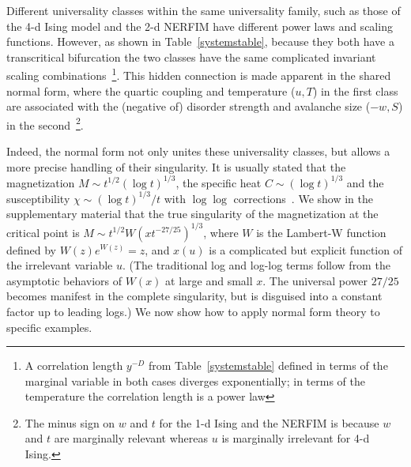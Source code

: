 \documentclass[
 reprint,
 amsmath,amssymb,
 aps, superscriptaddress, pre
]{revtex4-1}
\begin{document}
Different universality classes within the same universality family, such as those of the 4-d Ising model and the 2-d NERFIM have different power laws and scaling functions. However, as shown in Table~\ref{systemstable}, because they both have a transcritical bifurcation the two classes have the same complicated invariant scaling combinations~\footnote{A correlation length $y^{-D}$ from Table~\ref{systemstable} defined in terms of the marginal variable in both cases diverges exponentially; in terms of the temperature the correlation length is a power law}. This hidden connection is made apparent in the shared normal form, where the quartic coupling and temperature ($u,T$) in the first class are associated with the (negative of) disorder strength and avalanche size ($-w,S$) in the second~\footnote{The minus sign on $w$ and $t$ for the 1-d Ising
and the NERFIM is because $w$ and $t$ are 
marginally relevant whereas $u$ is marginally irrelevant for 4-d Ising.}.



Indeed, the normal form not only unites these universality classes, but allows a more precise handling of their singularity. It is usually stated that the magnetization $M \sim t^{1/2} (\log
t)^{1/3}$, the specific heat $C \sim (\log t)^{1/3}$ and the
susceptibility $\chi \sim (\log t)^{1/3}/t$ with $\log \log$ corrections~\cite{Wegner73}. We show in the supplementary material that
the true singularity of the magnetization
at the critical point is $M \sim t^{1/2} W(x t^{-27/25})^{1/3}$,
where $W$ is the Lambert-W function defined by $W(z) e^{W(z)} = z$, and
$x(u)$ is a complicated but explicit function of the irrelevant variable $u$.
(The traditional log
and log-log terms follow from the asymptotic behaviors of $W(x)$ at large
and small $x$. The universal power $27/25$ becomes manifest in the 
complete singularity, but is disguised into a constant factor up to
leading logs.) We now show how to apply normal form theory to specific examples. 
\end{document}
